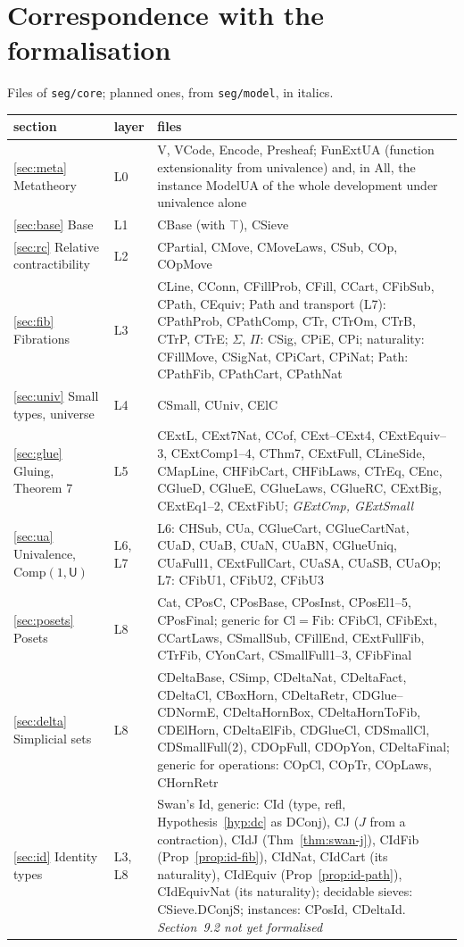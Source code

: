 \documentclass[11pt]{article}
\newcommand{\U}{\mathsf{U}}
\newcommand{\Fib}{\mathrm{Fib}}
\newcommand{\Comp}{\mathrm{Comp}}
\newcommand{\Cl}{\mathrm{Cl}}
\newcommand{\Id}{\mathrm{Id}}
\theoremstyle{plain}
\theoremstyle{definition}
\theoremstyle{remark}
\begin{document}
\appendix
\section{Correspondence with the formalisation}

\noindent Files of \texttt{seg/core}; planned ones, from \texttt{seg/model}, in italics.

\medskip
\begin{tabular}{p{3.6cm}p{0.9cm}p{9cm}}
section & layer & files\\\hline
\ref{sec:meta} Metatheory & L0 & V, VCode, Encode, Presheaf; FunExtUA (function extensionality from univalence) and, in All, the instance ModelUA of the whole development under univalence alone\\
\ref{sec:base} Base & L1 & CBase (with $\top$), CSieve\\
\ref{sec:rc} Relative contractibility & L2 & CPartial, CMove, CMoveLaws, CSub, COp, COpMove\\
\ref{sec:fib} Fibrations & L3 & CLine, CConn, CFillProb, CFill, CCart, CFibSub, CPath, CEquiv; Path and transport (L7): CPathProb, CPathComp, CTr, CTrOm, CTrB, CTrP, CTrE; $\Sigma$, $\Pi$: CSig, CPiE, CPi; naturality: CFillMove, CSigNat, CPiCart, CPiNat; Path: CPathFib, CPathCart, CPathNat\\
\ref{sec:univ} Small types, universe & L4 & CSmall, CUniv, CElC\\
\ref{sec:glue} Gluing, Theorem 7 & L5 & CExtL, CExt7Nat, CCof, CExt--CExt4, CExtEquiv--3, CExtComp1--4, CThm7, CExtFull, CLineSide, CMapLine, CHFibCart, CHFibLaws, CTrEq, CEnc, CGlueD, CGlueE, CGlueLaws, CGlueRC, CExtBig, CExtEq1--2, CExtFibU; \emph{GExtCmp, GExtSmall}\\
\ref{sec:ua} Univalence, $\Comp(1,\U)$ & L6, L7 & L6: CHSub, CUa, CGlueCart, CGlueCartNat, CUaD, CUaB, CUaN, CUaBN, CGlueUniq, CUaFull1, CExtFullCart, CUaSA, CUaSB, CUaOp; L7: CFibU1, CFibU2, CFibU3\\
\ref{sec:posets} Posets & L8 & Cat, CPosC, CPosBase, CPosInst, CPosEl1--5, CPosFinal; generic for $\Cl=\Fib$: CFibCl, CFibExt, CCartLaws, CSmallSub, CFillEnd, CExtFullFib, CTrFib, CYonCart, CSmallFull1--3, CFibFinal\\
\ref{sec:delta} Simplicial sets & L8 & CDeltaBase, CSimp, CDeltaNat, CDeltaFact, CDeltaCl, CBoxHorn, CDeltaRetr, CDGlue--CDNormE, CDeltaHornBox, CDeltaHornToFib, CDElHorn, CDeltaElFib, CDGlueCl, CDSmallCl, CDSmallFull(2), CDOpFull, CDOpYon, CDeltaFinal; generic for operations: COpCl, COpTr, COpLaws, CHornRetr\\
\ref{sec:id} Identity types & L3, L8 & Swan's $\Id$, generic: CId (type, refl, Hypothesis~\ref{hyp:dc} as DConj), CJ ($J$ from a contraction), CIdJ (Thm~\ref{thm:swan-j}), CIdFib (Prop~\ref{prop:id-fib}), CIdNat, CIdCart (its naturality), CIdEquiv (Prop~\ref{prop:id-path}), CIdEquivNat (its naturality); decidable sieves: CSieve.DConjS; instances: CPosId, CDeltaId. \emph{Section~9.2 not yet formalised}
\end{tabular}
\end{document}
